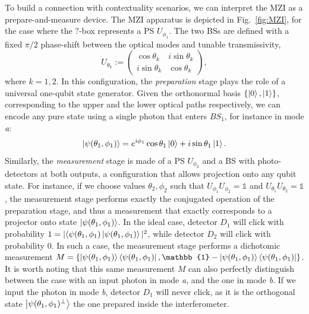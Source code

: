 \documentclass[letterpaper,onecolumn,12pt,accepted=2024-01-17]{article}
\begin{document}
To build a connection with contextuality scenarios, we can interpret the MZI as a prepare-and-measure device. The MZI apparatus is depicted in Fig.~\ref{fig:MZI}, for the case where the $?$-box represents a PS $U_{\phi_1}$. The two BSs are defined with a fixed $\pi/2$ phase-shift between the optical modes and tunable transmissivity,
\begin{equation}\label{eq: BS}
    U_{\theta_k} := \left(\begin{matrix}\cos\theta_k&i\sin\theta_k\\i\sin\theta_k&\cos\theta_k\end{matrix}\right),
\end{equation}
where $k=1,2$. In this configuration, the \textit{preparation} stage plays the role of a universal one-qubit state generator. Given the orthonormal basis $\{\ket{0},\ket{1}\}$, corresponding to the upper and the lower optical paths respectively, we can encode any pure state using a single photon that enters $BS_1$, for instance in mode \textit{a}:
\begin{align}\label{eq: state inside the interferometer}
    \ket{\psi(\theta_1,\phi_1)} = e^{i\phi_1}\cos\theta_1 \ket{0}+i\sin\theta_1\ket{1}.
\end{align}
Similarly, the \textit{measurement} stage is made of a PS $U_{\phi_2}$ and a BS with photo-detectors at both outputs, a configuration that allows projection onto any qubit state. For instance, if we choose values $\theta_2,\phi_2$ such that  $U_{\phi_1}U_{\phi_2}=\mathbb{1}$ and $U_{\theta_1}U_{\theta_2}=\mathbb{1}$, the measurement stage performs exactly the conjugated operation of the preparation stage, and thus a measurement that exactly corresponds to a projector onto state $\ket{\psi(\theta_1,\phi_1)}$. In the ideal case, detector $D_1$ will click with probability $1 = \vert \langle \psi(\theta_1,\phi_1)\ket{\psi(\theta_1,\phi_1)} \vert^2$, while detector $D_2$ will click with probability $0$. In such a case, the measurement stage performs a dichotomic measurement $M=\{\ket{\psi(\theta_1,\phi_1)}\bra{\psi(\theta_1,\phi_1)}, \mathbb{1}- \ket{\psi(\theta_1,\phi_1)}\bra{\psi(\theta_1,\phi_1)}\}$. It is worth noting that this same measurement $M$ can also perfectly distinguish between the case with an input photon in mode \textit{a}, and the one in mode \textit{b}. If we input the photon in mode \textit{b}, detector $D_1$ will never click, as it is the orthogonal state $\ket{\psi(\theta_1,\phi_1)^\perp}$ the one prepared inside the interferometer. 
\end{document}
